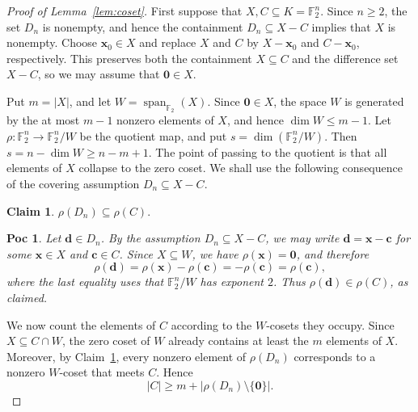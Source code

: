 \documentclass[10pt,a4paper]{amsart}
\newtheorem{claim}{Claim}
\newtheorem{poc}{Poc}
\begin{document}
\begin{proof}[Proof of Lemma~\ref{lem:coset}]
First suppose that \(X,C\subseteq K=\mathbb{F}_2^n\). Since \(n\ge 2\), the set \(D_n\) is nonempty, and hence the containment \(D_n\subseteq X-C\) implies that \(X\) is nonempty. Choose \(\boldsymbol{x}_0\in X\) and replace \(X\) and \(C\) by \(X-\boldsymbol{x}_0\) and \(C-\boldsymbol{x}_0\), respectively. This preserves both the containment \(X\subseteq C\) and the difference set \(X-C\), so we may assume that \(\boldsymbol{0}\in X\).

Put \(m=|X|\), and let
\(
    W=\operatorname{span}_{\mathbb{F}_2}(X).
\)
Since \(\boldsymbol{0}\in X\), the space \(W\) is generated by the at most \(m-1\) nonzero elements of \(X\), and hence
\(
    \dim W\le m-1.
\)
Let
\(
    \rho:\mathbb{F}_2^n\to \mathbb{F}_2^n/W
\)
be the quotient map, and put \(s=\dim(\mathbb{F}_2^n/W)\). Then
\(
    s=n-\dim W\ge n-m+1.
\)
The point of passing to the quotient is that all elements of \(X\) collapse to the zero coset.  We shall use the following consequence of the covering assumption \(D_n\subseteq X-C\).
\begin{claim}\label{claim:containmentRho}
    \(
        \rho(D_n)\subseteq \rho(C).
    \)
\end{claim}
\begin{poc}
    Let \(\boldsymbol{d}\in D_n\).  By the assumption \(D_n\subseteq X-C\), we may write
    \(
        \boldsymbol{d}=\boldsymbol{x}-\boldsymbol{c}
    \)
    for some \(\boldsymbol{x}\in X\) and \(\boldsymbol{c}\in C\).  Since \(X\subseteq W\), we have \(\rho(\boldsymbol{x})=\boldsymbol{0}\), and therefore
    \[
        \rho(\boldsymbol{d})
        =
        \rho(\boldsymbol{x})-\rho(\boldsymbol{c})
        =
        -\rho(\boldsymbol{c})
        =
        \rho(\boldsymbol{c}),
    \]
    where the last equality uses that \(\mathbb{F}_2^n/W\) has exponent \(2\).  Thus \(\rho(\boldsymbol{d})\in \rho(C)\), as claimed.
\end{poc}

We now count the elements of \(C\) according to the \(W\)-cosets they occupy.  Since \(X\subseteq C\cap W\), the zero coset of \(W\) already contains at least the \(m\) elements of \(X\).  Moreover, by Claim~\ref{claim:containmentRho}, every nonzero element of \(\rho(D_n)\) corresponds to a nonzero \(W\)-coset that meets \(C\).  Hence
\[
    |C|\ge m+|\rho(D_n)\setminus\{\boldsymbol{0}\}|.
\]


\end{proof}
\end{document}
